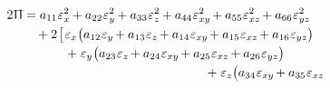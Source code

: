 \nopagebreak\vspace{-0.3em}
\begin{equation}\label{elasticenergylooongcartesian}
\begin{multlined}
\hspace{-1em}
2 \hspace{.1ex} \potentialenergydensity
= a_{11} \infinitesimaldeformationcomponents{x}^2 \hspace{-0.1ex}
+ a_{22} \infinitesimaldeformationcomponents{y}^2 \hspace{-0.1ex}
+ a_{33} \infinitesimaldeformationcomponents{z}^2 \hspace{-0.1ex}
+ a_{44} \infinitesimaldeformationcomponents{xy}^2 \hspace{-0.2ex}
+ a_{55} \infinitesimaldeformationcomponents{xz}^2 \hspace{-0.2ex}
+ a_{66} \infinitesimaldeformationcomponents{yz}^2
\\[-0.1em]
%
\hspace{.5em}
{} + 2 \hspace{.2ex} \bigl[ \hspace{.1ex}
%
\infinitesimaldeformationcomponents{x} \hspace{.1ex}
\bigl( a_{12} \infinitesimaldeformationcomponents{y} \hspace{-0.2ex}
+ a_{13} \infinitesimaldeformationcomponents{z} \hspace{-0.2ex}
+ a_{14} \infinitesimaldeformationcomponents{xy} \hspace{-0.2ex}
+ a_{15} \infinitesimaldeformationcomponents{xz} \hspace{-0.2ex}
+ a_{16} \infinitesimaldeformationcomponents{yz} \bigr)
\\[-0.1em]
%
\hspace{.5em}
+ \infinitesimaldeformationcomponents{y} \hspace{.1ex} \bigl(
a_{23} \infinitesimaldeformationcomponents{z} \hspace{-0.2ex}
+ a_{24} \infinitesimaldeformationcomponents{xy} \hspace{-0.2ex}
+ a_{25} \infinitesimaldeformationcomponents{xz} \hspace{-0.2ex}
+ a_{26} \infinitesimaldeformationcomponents{yz} \bigr)
\\[-0.1em]
%
\hspace{.5em}
+ \infinitesimaldeformationcomponents{z} \bigl(
a_{34} \infinitesimaldeformationcomponents{xy} \hspace{-0.2ex}
+ a_{35} \infinitesimaldeformationcomponents{xz} \hspace{-0.2ex}

\end{multlined}
\end{equation}
